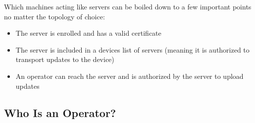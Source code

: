\documentclass[0-thesis.tex]{subfiles}
\begin{document}
Which machines acting like servers can be boiled down to a few important points no matter
the topology of choice:

\begin{itemize}
    \item The server is enrolled and has a valid certificate
    \item The server is included in a devices list of servers (meaning it is authorized to
            transport updates to the device)
    \item An operator can reach the server and is authorized by the server to upload updates
\end{itemize}

\subsection{Who Is an Operator?}
\label{ssec:who-is-an-operator}
\end{document}
